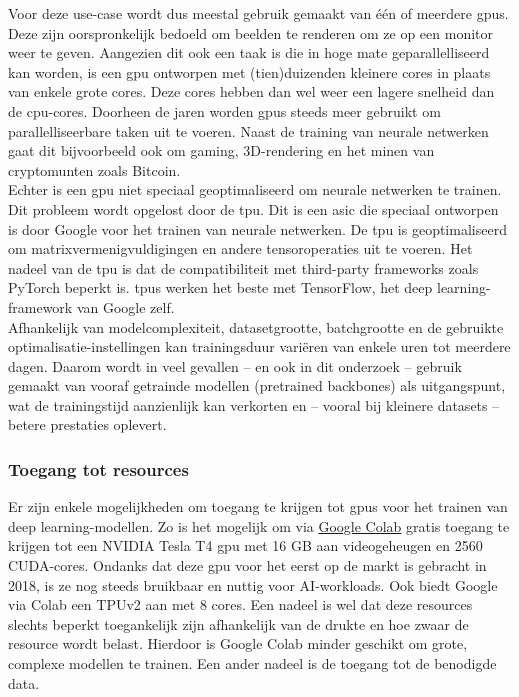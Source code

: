 Voor deze use-case wordt dus meestal gebruik gemaakt van één of meerdere \glspl{gpu}. Deze zijn oorspronkelijk bedoeld om beelden te renderen om ze op een monitor weer te geven. Aangezien dit ook een taak is die in hoge mate geparallelliseerd kan worden, is een \gls{gpu} ontworpen met (tien)duizenden kleinere cores in plaats van enkele grote cores. Deze cores hebben dan wel weer een lagere snelheid dan de \gls{cpu}-cores. Doorheen de jaren worden \glspl{gpu} steeds meer gebruikt om parallelliseerbare taken uit te voeren. Naast de training van neurale netwerken gaat dit bijvoorbeeld ook om gaming, 3D-rendering en het minen van cryptomunten zoals Bitcoin. \autocite{Anish_Dev_2014} \\

Echter is een \gls{gpu} niet speciaal geoptimaliseerd om neurale netwerken te trainen. Dit probleem wordt opgelost door de \gls{tpu}. Dit is een \gls{asic} die speciaal ontworpen is door Google voor het trainen van neurale netwerken. De \gls{tpu} is geoptimaliseerd om matrixvermenigvuldigingen en andere tensoroperaties uit te voeren. \autocite{Jouppi_2017} Het nadeel van de \gls{tpu} is dat de compatibiliteit met third-party frameworks zoals PyTorch beperkt is. \glspl{tpu} werken het beste met TensorFlow, het deep learning-framework van Google zelf. \autocite{Wang_2019} \\

Afhankelijk van modelcomplexiteit, datasetgrootte, batchgrootte en de gebruikte optimalisatie-instellingen kan trainingsduur variëren van enkele uren tot meerdere dagen. Daarom wordt in veel gevallen -- en ook in dit onderzoek -- gebruik gemaakt van vooraf getrainde modellen (pretrained backbones) als uitgangspunt, wat de trainingstijd aanzienlijk kan verkorten en -- vooral bij kleinere datasets -- betere prestaties oplevert.

\subsubsection{Toegang tot resources}

Er zijn enkele mogelijkheden om toegang te krijgen tot \glspl{gpu} voor het trainen van deep learning-modellen. Zo is het mogelijk om via \href{https://colab.research.google.com/}{Google Colab} gratis toegang te krijgen tot een NVIDIA Tesla T4 \gls{gpu} met 16 GB aan videogeheugen en 2560 CUDA-cores. \autocite{TechPowerUp_Tesla-T4} Ondanks dat deze \gls{gpu} voor het eerst op de markt is gebracht in 2018, is ze nog steeds bruikbaar en nuttig voor AI-workloads. Ook biedt Google via Colab een TPUv2 aan met 8 cores. Een nadeel is wel dat deze resources slechts beperkt toegankelijk zijn afhankelijk van de drukte en hoe zwaar de resource wordt belast. Hierdoor is Google Colab minder geschikt om grote, complexe modellen te trainen. Een ander nadeel is de toegang tot de benodigde data. \\

